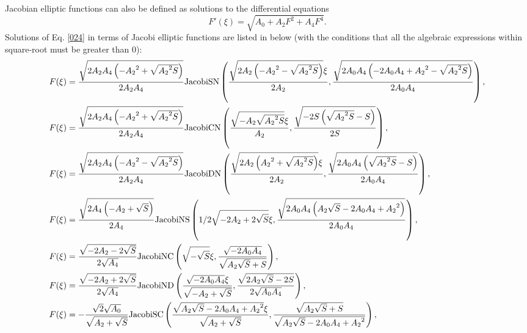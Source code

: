 \documentclass[prd,aps,floats,showkeys,nofootinbib,notitlepage]{revtex4-2}
\begin{document}
	Jacobian elliptic functions can also be defined as solutions to the differential equations \cite{fexpn024,fexpn024_1,Schwalm}
	\begin{equation}\label{024}
		F'(\xi)=\sqrt{A_0+A_2F^2+A_4F^4}.
	\end{equation}
	Solutions of Eq. \eqref{024} in terms of  Jacobi elliptic functions are listed in below (with the conditions that all the algebraic expressions within square-root must be greater than $0$):
	\begin{subequations}\label{024_solu}
		\begin{align}
			&F(\xi)=   \frac{{\sqrt {2{A_2} {A_4} \left( { - {A_2}^2 + \sqrt {{A_2}^2S} } \right)} }}{{2{A_2} {A_4}}}{\text{JacobiSN}}\left( {\frac{{\sqrt {2{A_2} \left( { - {A_2}^2 - \sqrt {{A_2}^2S} } \right)} \xi }}{{2{A_2}}},\frac{{\sqrt {2{A_0} {A_4} \left( { - 2 {A_0} {A_4} + {A_2}^2 - \sqrt {{A_2}^2S} } \right)} }}{{2{A_0} {A_4}}}} \right), \hfill \\
			&F(\xi)=    \frac{{\sqrt {2{A_2} {A_4} \left( { - {A_2}^2 + \sqrt {{A_2}^2S} } \right)} }}{{2{A_2} {A_4}}}{\text{JacobiCN}}\left( {\frac{{\sqrt { - {A_2} \sqrt {{A_2}^2S} } \xi }}{{{A_2}}},\frac{{\sqrt { - 2S\left( {\sqrt {{A_2}^2S}  - S} \right)} }}{{2S}}} \right), \hfill \\
			&F(\xi)=    \frac{{\sqrt {2{A_2} {A_4} \left( { - {A_2}^2 - \sqrt {{A_2}^2S} } \right)} }}{{2{A_2} {A_4}}}{\text{JacobiDN}}\left( { \frac{{\sqrt {2{A_2} \left( {{A_2}^2 + \sqrt {{A_2}^2S} } \right)} \xi }}{{2{A_2}}}, \frac{{\sqrt {2{A_0} {A_4} \left( {\sqrt {{A_2}^2S}  - S} \right)} }}{{2{A_0} {A_4}}}} \right), \hfill \\
			&F(\xi)=    \frac{{\sqrt {2{A_4} \left( { - {A_2} + \sqrt S } \right)} }}{{2{A_4}}}{\text{JacobiNS}}\left( {1/2 \sqrt { - 2 {A_2} + 2 \sqrt S } \xi , \frac{{\sqrt {2{A_0} {A_4} \left( {{A_2} \sqrt S  - 2 {A_0} {A_4} + {A_2}^2} \right)} }}{{2{A_0} {A_4}}}} \right), \hfill \\
			&F(\xi)=   \frac{{\sqrt { - 2{A_2} - 2\sqrt S } }}{{2\sqrt {{A_4}} }}{\text{JacobiNC}}\left( {\sqrt { - \sqrt S } \xi ,\frac{{\sqrt { - 2 {A_0} {A_4}} }}{{\sqrt {{A_2} \sqrt S  + S} }}} \right),\\
			&F(\xi)=   \frac{{\sqrt { - 2{A_2} + 2\sqrt S } }}{{2\sqrt {{A_4}} }}{\text{JacobiND}}\left( {\frac{{\sqrt { - 2 {A_0} {A_4}} \xi }}{{\sqrt { - {A_2} + \sqrt S } }},\frac{{\sqrt {2{A_2} \sqrt S  - 2S} }}{{2\sqrt {{A_0} {A_4}} }}} \right), \hfill \\
			&F(\xi)=   - \frac{{\sqrt 2 \sqrt {{A_0}} }}{{\sqrt {{A_2} + \sqrt S } }}{\text{JacobiSC}}\left( {\frac{{\sqrt {{A_2} \sqrt S  - 2 {A_0} {A_4} + {A_2}^2} \xi }}{{\sqrt {{A_2} + \sqrt S } }},\frac{{\sqrt {{A_2} \sqrt S  + S} }}{{\sqrt {{A_2} \sqrt S  - 2 {A_0} {A_4} + {A_2}^2} }}} \right), \hfill \\

\end{align}
\end{subequations}
\end{document}
